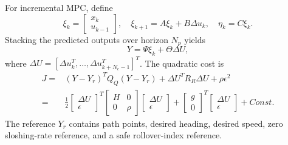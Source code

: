 For incremental MPC, define
\begin{equation}
  \xi_k=\begin{bmatrix}x_k\\u_{k-1}\end{bmatrix},\quad
  \xi_{k+1}=A\xi_k+B\Delta u_k,\quad
  \eta_k=C\xi_k.
  \label{eq:incremental_mpc_state}
\end{equation}
Stacking the predicted outputs over horizon $N_p$ yields
\begin{equation}
  Y=\Psi\xi_k+\Theta\Delta U,
  \label{eq:stacked_output}
\end{equation}
where $\Delta U=[\Delta u_k^T,\ldots,\Delta u_{k+N_c-1}^T]^T$. The quadratic cost is
\begin{equation}
\begin{aligned}
J=&(Y-Y_r)^TQ_Q(Y-Y_r)+\Delta U^TR_R\Delta U+\rho\epsilon^2\\
=&\frac{1}{2}
\begin{bmatrix}\Delta U\\\epsilon\end{bmatrix}^T
\begin{bmatrix}H&0\\0&\rho\end{bmatrix}
\begin{bmatrix}\Delta U\\\epsilon\end{bmatrix}
+\begin{bmatrix}g\\0\end{bmatrix}^T
\begin{bmatrix}\Delta U\\\epsilon\end{bmatrix}
 + Const.
\end{aligned}
\label{eq:mpc_cost}
\end{equation}
The reference $Y_r$ contains path points, desired heading, desired speed, zero sloshing-rate reference, and a safe rollover-index reference.

